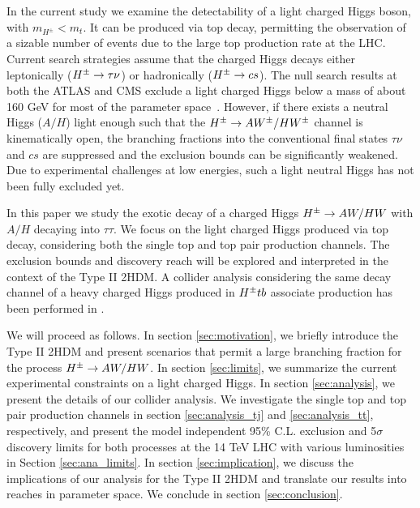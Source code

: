 In the current study we examine the detectability of a light charged Higgs boson, with $m_{H^\pm}<m_t$. It can be produced via top decay, permitting the observation of a sizable number of events due to the large top production rate at the LHC. Current search strategies assume that the charged Higgs decays either leptonically ($H^{\pm} \to \tau\nu$) or hadronically ($H^{\pm} \to cs$).  The null search results at both the ATLAS and CMS  exclude a light charged Higgs below a mass of about 160 GeV for most of  the parameter  space~\cite{TheATLAScollaboration:2013wia,CMS:2014cdp}.  However, if there exists a neutral Higgs ($A/H$) light enough such that the $H^{\pm} \to AW^{\pm}/HW^{\pm}$ channel is kinematically open, the branching fractions into the conventional final states $\tau\nu$ and $cs$ are suppressed and the exclusion bounds can be significantly weakened. Due to experimental challenges at low energies, such a light neutral Higgs has not been fully excluded yet. 

In this paper we study the exotic decay of a   charged Higgs $H^{\pm} \to AW/HW$  with $A/H$ decaying into  $\tau\tau$.  We focus on the light charged Higgs  produced via top decay, considering both the single top and top pair production channels. The exclusion bounds and discovery reach will be explored and interpreted in the context of the Type II 2HDM.  A collider analysis considering the same decay channel of a heavy charged Higgs   produced in $H^{\pm} tb$ associate production has been performed in \cite{Coleppa:2014cca}.  

We will proceed as follows. In section \ref{sec:motivation}, we   briefly introduce the Type II  2HDM and present scenarios that permit a large branching fraction for the process $H^{\pm} \to AW/HW$. In section \ref{sec:limits}, we   summarize the current experimental constraints on a light charged Higgs. In section \ref{sec:analysis},  we present the details of our collider analysis. We investigate the single top and top pair production channels in section \ref{sec:analysis_tj}  and \ref{sec:analysis_tt},   respectively,  and present the model independent 95\% C.L. exclusion and  5$\sigma$ discovery limits for both processes at the 14 TeV LHC with various luminosities in Section \ref{sec:ana_limits}.  In section \ref{sec:implication}, we   discuss the implications of our analysis for the Type II 2HDM and translate our results into reaches in parameter space. We conclude in section \ref{sec:conclusion}.
  
 
